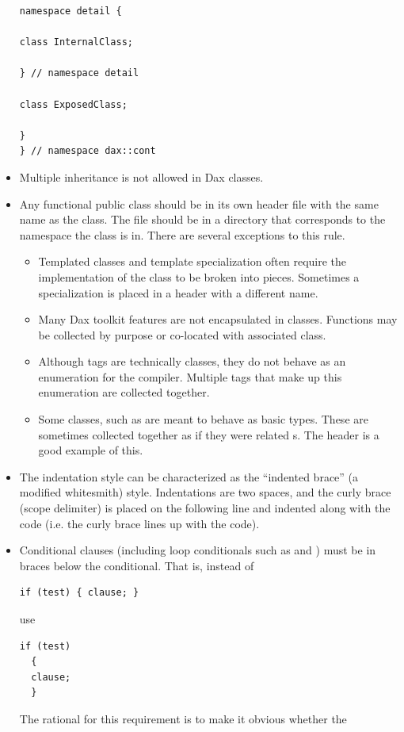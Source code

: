 \begin{itemize}
\begin{verbatim}
namespace detail {

class InternalClass;

} // namespace detail

class ExposedClass;

}
} // namespace dax::cont
\end{verbatim}
\item Multiple inheritance is not allowed in Dax classes.
\item Any functional public class should be in its own header file with the
  same name as the class. The file should be in a directory that
  corresponds to the namespace the class is in. There are several
  exceptions to this rule.
  \begin{itemize}
  \item Templated classes and template specialization often require the
    implementation of the class to be broken into pieces. Sometimes a
    specialization is placed in a header with a different name.
  \item Many Dax toolkit features are not encapsulated in
    classes. Functions may be collected by purpose or co-located with
    associated class.
  \item Although tags are technically classes, they do not behave as an
    enumeration for the compiler. Multiple tags that make up this
    enumeration are collected together.
  \item Some classes, such as  are meant to behave as basic
    types. These are sometimes collected together as if they were related
    s. The  header is a good
    example of this.
  \end{itemize}
\item The indentation style can be characterized as the ``indented brace''
  (a modified whitesmith) style. Indentations are two spaces, and the curly
  brace (scope delimiter) is placed on the following line and indented
  along with the code (i.e. the curly brace lines up with the code).
\item Conditional clauses (including loop conditionals such as
   and ) must be in braces below the
  conditional. That is, instead of
  \begin{verbatim}
if (test) { clause; }
\end{verbatim}
  use
  \begin{verbatim}
if (test)
  {
  clause;
  }
\end{verbatim}
  The rational for this requirement is to make it obvious whether the

\end{itemize}
